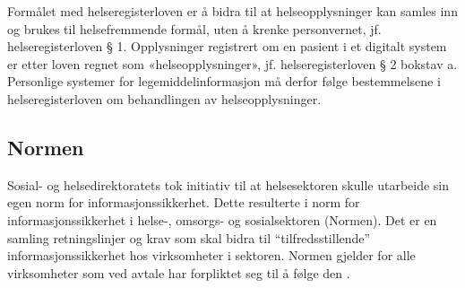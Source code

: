 Formålet med helseregisterloven er å bidra til at helseopplysninger kan samles inn og brukes til helsefremmende formål, uten å krenke personvernet, jf. helseregisterloven § 1. Opplysninger  registrert om en pasient i et digitalt system er etter loven regnet som «helseopplysninger», jf. helseregisterloven § 2 bokstav a. Personlige systemer for legemiddelinformasjon må derfor følge bestemmelsene i helseregisterloven om behandlingen av helseopplysninger.

\subsection{Normen}
Sosial- og helsedirektoratets tok initiativ til at helsesektoren skulle utarbeide sin egen norm for informasjonssikkerhet. Dette resulterte i norm for informasjonssikkerhet i helse-, omsorgs- og sosialsektoren (Normen). Det er en samling retningslinjer og krav som skal bidra til “tilfredsstillende” informasjonssikkerhet hos virksomheter i sektoren. Normen gjelder for alle virksomheter som ved avtale har forpliktet seg til å følge den \citep{OmNormen}.
